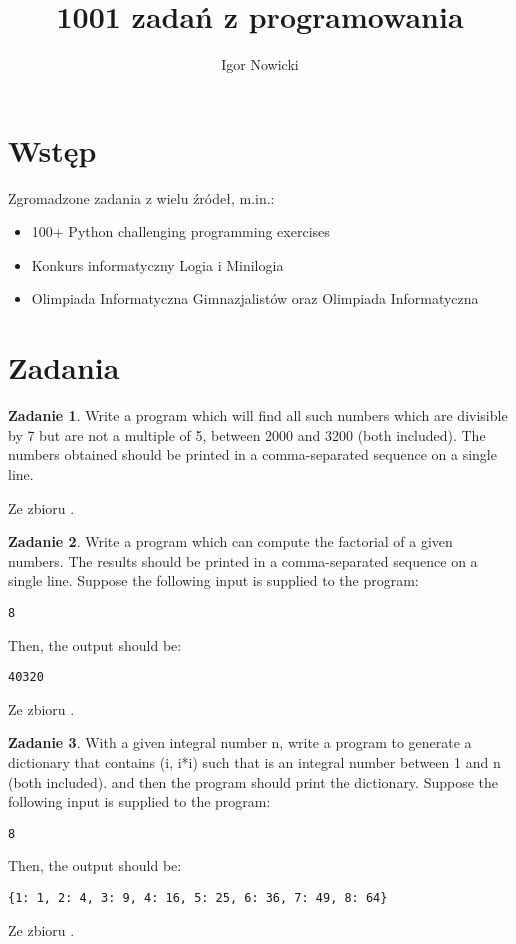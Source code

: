 \documentclass[11pt]{article}
\title{1001 zadań z programowania}
\author{Igor Nowicki}
\theoremstyle{definition}
\newtheorem{zadanie}{Zadanie}
\newcommand{\fromA}{\small Ze zbioru \cite{python100}.}
\begin{document}
\maketitle
\tableofcontents
\section{Wstęp}

Zgromadzone zadania z wielu źródeł, m.in.:

\begin{itemize}
\item 100+ Python challenging programming exercises
\item Konkurs informatyczny Logia i Minilogia
\item Olimpiada Informatyczna Gimnazjalistów oraz Olimpiada Informatyczna
\end{itemize}

\section{Zadania}

\begin{zadanie}
Write a program which will find all such numbers which are divisible by 7 but are not a multiple of 5,
between 2000 and 3200 (both included).
The numbers obtained should be printed in a comma-separated sequence on a single line.

\fromA
\end{zadanie}

\begin{zadanie}
Write a program which can compute the factorial of a given numbers.
The results should be printed in a comma-separated sequence on a single line.
Suppose the following input is supplied to the program:
\begin{verbatim}
8
\end{verbatim}
Then, the output should be:
\begin{verbatim}
40320
\end{verbatim}

\fromA
\end{zadanie}

\begin{zadanie}
With a given integral number n, write a program to generate a dictionary that contains (i, i*i) such that is an integral number between 1 and n (both included). and then the program should print the dictionary.
Suppose the following input is supplied to the program:
\begin{verbatim}
8
\end{verbatim}
Then, the output should be:
\begin{verbatim}
{1: 1, 2: 4, 3: 9, 4: 16, 5: 25, 6: 36, 7: 49, 8: 64}
\end{verbatim}

\fromA
\end{zadanie}
\end{document}
